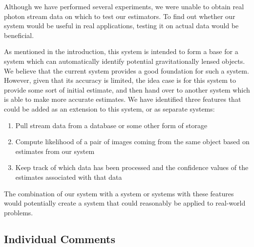 \documentclass[a4paper,11pt]{article}
\begin{document}
Although we have performed several experiments, we were unable to obtain real
photon stream data on which to test our estimators. To find out whether our
system would be useful in real applications, testing it on actual data would be
beneficial.

As mentioned in the introduction, this system is intended to form a base for a
system which can automatically identify potential gravitationally lensed
objects. We believe that the current system provides a good foundation for such
a system. However, given that its accuracy is limited, the idea case is for this
system to provide some sort of initial estimate, and then hand over to another
system which is able to make more accurate estimates. We have identified three
features that could be added as an extension to this system, or as separate
systems:
\begin{enumerate}
\item Pull stream data from a database or some other form of storage
\item Compute likelihood of a pair of images coming from the same object based on
   estimates from our system
\item Keep track of which data has been processed and the confidence
   values of the estimates associated with that data
\end{enumerate}
The combination of our system with a system or systems with these features would
potentially create a system that could reasonably be applied to real-world problems.
\subsection{Individual Comments}
\label{sec-8-2}
\end{document}
